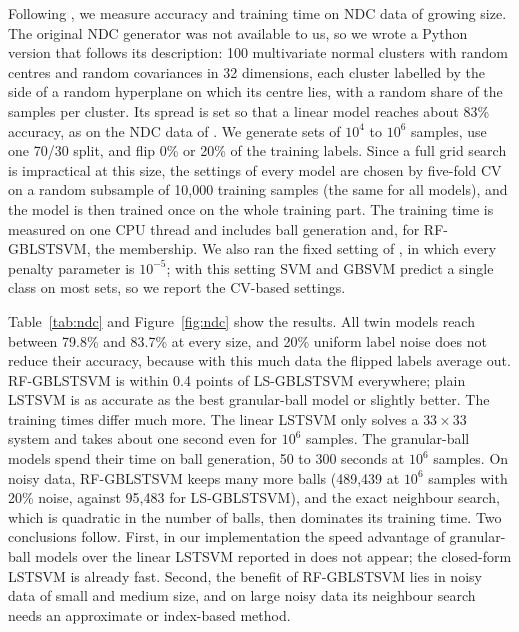 \documentclass[preprint,12pt]{elsarticle}
\newcommand{\RF}{RF-GBLSTSVM}
\begin{document}
Following \cite{tanveer2024gblstsvm}, we measure accuracy and training time on NDC data \cite{musicant1998} of growing size. The original NDC generator was not available to us, so we wrote a Python version that follows its description: 100 multivariate normal clusters with random centres and random covariances in 32 dimensions, each cluster labelled by the side of a random hyperplane on which its centre lies, with a random share of the samples per cluster. Its spread is set so that a linear model reaches about 83\% accuracy, as on the NDC data of \cite{tanveer2024gblstsvm}. We generate sets of $10^4$ to $10^6$ samples, use one 70/30 split, and flip 0\% or 20\% of the training labels. Since a full grid search is impractical at this size, the settings of every model are chosen by five-fold CV on a random subsample of 10{,}000 training samples (the same for all models), and the model is then trained once on the whole training part. The training time is measured on one CPU thread and includes ball generation and, for \RF{}, the membership. We also ran the fixed setting of \cite{tanveer2024gblstsvm}, in which every penalty parameter is $10^{-5}$; with this setting SVM and GBSVM predict a single class on most sets, so we report the CV-based settings.

Table~\ref{tab:ndc} and Figure~\ref{fig:ndc} show the results. All twin models reach between 79.8\% and 83.7\% at every size, and 20\% uniform label noise does not reduce their accuracy, because with this much data the flipped labels average out. \RF{} is within 0.4 points of LS-GBLSTSVM everywhere; plain LSTSVM is as accurate as the best granular-ball model or slightly better. The training times differ much more. The linear LSTSVM only solves a $33\times 33$ system and takes about one second even for $10^6$ samples. The granular-ball models spend their time on ball generation, 50 to 300 seconds at $10^6$ samples. On noisy data, \RF{} keeps many more balls (489{,}439 at $10^6$ samples with 20\% noise, against 95{,}483 for LS-GBLSTSVM), and the exact neighbour search, which is quadratic in the number of balls, then dominates its training time. Two conclusions follow. First, in our implementation the speed advantage of granular-ball models over the linear LSTSVM reported in \cite{tanveer2024gblstsvm} does not appear; the closed-form LSTSVM is already fast. Second, the benefit of \RF{} lies in noisy data of small and medium size, and on large noisy data its neighbour search needs an approximate or index-based method.


\end{document}
